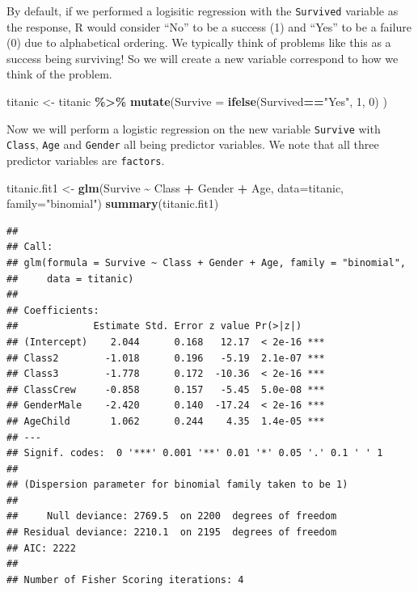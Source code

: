 \documentclass[
]{book}
\newenvironment{Shaded}{\begin{snugshade}}{\end{snugshade}}
\newcommand{\AttributeTok}[1]{\textcolor[rgb]{0.13,0.29,0.53}{#1}}
\newcommand{\DecValTok}[1]{\textcolor[rgb]{0.00,0.00,0.81}{#1}}
\newcommand{\FunctionTok}[1]{\textcolor[rgb]{0.13,0.29,0.53}{\textbf{#1}}}
\newcommand{\NormalTok}[1]{#1}
\newcommand{\OtherTok}[1]{\textcolor[rgb]{0.56,0.35,0.01}{#1}}
\newcommand{\SpecialCharTok}[1]{\textcolor[rgb]{0.81,0.36,0.00}{\textbf{#1}}}
\newcommand{\StringTok}[1]{\textcolor[rgb]{0.31,0.60,0.02}{#1}}
\begin{document}
By default, if we performed a logisitic regression with the \texttt{Survived} variable as the response, R would consider ``No'' to be a success (1) and ``Yes'' to be a failure (0) due to alphabetical ordering. We typically think of problems like this as a success being surviving! So we will create a new variable correspond to how we think of the problem.

\begin{Shaded}
\begin{Highlighting}[]
\NormalTok{titanic }\OtherTok{\textless{}{-}}\NormalTok{ titanic }\SpecialCharTok{\%\textgreater{}\%}
  \FunctionTok{mutate}\NormalTok{(}\AttributeTok{Survive =} \FunctionTok{ifelse}\NormalTok{(Survived}\SpecialCharTok{==}\StringTok{"Yes"}\NormalTok{, }\DecValTok{1}\NormalTok{, }\DecValTok{0}\NormalTok{) )}
\end{Highlighting}
\end{Shaded}

Now we will perform a logistic regression on the new variable \texttt{Survive} with \texttt{Class}, \texttt{Age} and \texttt{Gender} all being predictor variables. We note that all three predictor variables are \texttt{factors}.

\begin{Shaded}
\begin{Highlighting}[]
\NormalTok{titanic.fit1 }\OtherTok{\textless{}{-}} \FunctionTok{glm}\NormalTok{(Survive }\SpecialCharTok{\textasciitilde{}}\NormalTok{ Class }\SpecialCharTok{+}\NormalTok{ Gender }\SpecialCharTok{+}\NormalTok{ Age, }\AttributeTok{data=}\NormalTok{titanic, }\AttributeTok{family=}\StringTok{"binomial"}\NormalTok{)}
\FunctionTok{summary}\NormalTok{(titanic.fit1)}
\end{Highlighting}
\end{Shaded}

\begin{verbatim}
## 
## Call:
## glm(formula = Survive ~ Class + Gender + Age, family = "binomial", 
##     data = titanic)
## 
## Coefficients:
##             Estimate Std. Error z value Pr(>|z|)    
## (Intercept)    2.044      0.168   12.17  < 2e-16 ***
## Class2        -1.018      0.196   -5.19  2.1e-07 ***
## Class3        -1.778      0.172  -10.36  < 2e-16 ***
## ClassCrew     -0.858      0.157   -5.45  5.0e-08 ***
## GenderMale    -2.420      0.140  -17.24  < 2e-16 ***
## AgeChild       1.062      0.244    4.35  1.4e-05 ***
## ---
## Signif. codes:  0 '***' 0.001 '**' 0.01 '*' 0.05 '.' 0.1 ' ' 1
## 
## (Dispersion parameter for binomial family taken to be 1)
## 
##     Null deviance: 2769.5  on 2200  degrees of freedom
## Residual deviance: 2210.1  on 2195  degrees of freedom
## AIC: 2222
## 
## Number of Fisher Scoring iterations: 4
\end{verbatim}
\end{document}
